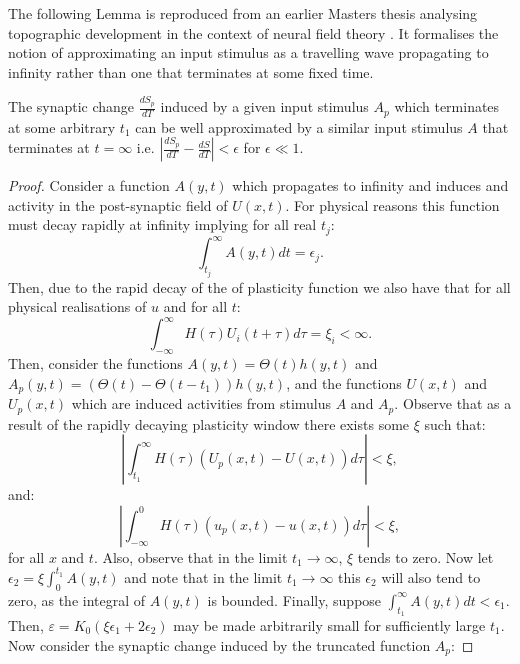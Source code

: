 The following Lemma is reproduced from an earlier Masters thesis analysing topographic development in the context of neural field theory \cite{Gale2017-ve}. It formalises the notion of approximating an input stimulus as a travelling wave propagating to infinity rather than one that terminates at some fixed time.

\begin{lemma}
	\label{lemma:decay}
	The synaptic change $\frac{dS_p}{dT}$ induced by a given input stimulus $A_p$ which terminates at some arbitrary $t_1$ can be well approximated by a similar input stimulus $A$ that terminates at $t=\infty$ i.e. $|\frac{dS_p}{dT} - \frac{dS}{dT}|<\epsilon$ for $\epsilon \ll 1$. 
\end{lemma}

\begin{proof}
	Consider a function $A(y,t)$ which propagates to infinity and induces and activity in the post-synaptic field of $U(x,t)$. For physical reasons this function must decay rapidly at infinity implying for all real $t_j$:
	\begin{equation}
		\int_{t_j}^{\infty} A(y,t)dt =\epsilon_j.
	\end{equation}
	Then, due to the rapid decay of the of plasticity function we also have that for all physical realisations of $u$ and for all $t$:
	\begin{equation}
		\int_{-\infty}^{\infty} H(\tau) U_i(t+\tau)d\tau = \xi_i <\infty.
	\end{equation}
	Then, consider the functions $A(y,t)=\Theta(t) h(y,t)$ and $A_p(y,t)=(\Theta(t)-\Theta(t-t_1))h(y,t)$, and the functions $U(x,t)$ and $U_p(x,t)$ which are induced activities from stimulus $A$ and $A_p$. Observe that as a result of the rapidly decaying plasticity window there exists some $\xi$ such that:
	\begin{equation} 
		\left|\int_{t_1}^{\infty} H(\tau) (U_p(x,t)-U(x,t)) d\tau \right|< \xi,
	\end{equation} and: 
	\begin{equation}
		\left|\int_{-\infty}^{0} H(\tau) (u_p(x,t)-u(x,t)) d\tau \right|< \xi,
	\end{equation}
	for all $x$ and $t$. Also, observe that in the limit $t_1 \rightarrow \infty$, $\xi$ tends to zero. Now let $\epsilon_2 = \xi \int_{0}^{t_1} A(y,t)$ and note that in the limit $t_1 \rightarrow \infty$ this $\epsilon_2$ will also tend to zero, as the integral of $A(y,t)$ is bounded. Finally, suppose $\int_{t_1}^{\infty} A(y,t) dt < \epsilon_1$. Then, $\varepsilon = K_0 (\xi \epsilon_1 + 2\epsilon_2)$ may be made arbitrarily small for sufficiently large $t_1$. Now consider the synaptic change induced by the truncated function $A_p$:

\end{proof}
